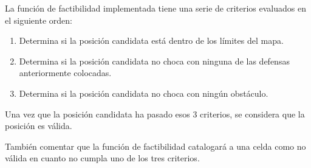 La función de factibilidad implementada tiene una serie de criterios evaluados en el siguiente orden:
\begin{enumerate}
\item Determina si la posición candidata está dentro de los límites del mapa.
\item Determina si la posición candidata no choca con ninguna de las defensas anteriormente colocadas.
\item Determina si la posición candidata no choca con ningún obstáculo.
\end{enumerate}

Una vez que la posición candidata ha pasado esos 3 criterios, se considera que la posición es válida.

También comentar que la función de factibilidad catalogará a una celda como no válida en cuanto no cumpla uno de los tres criterios.